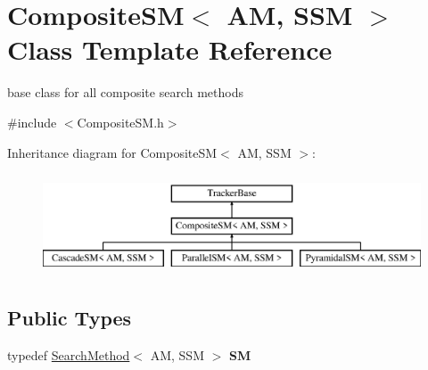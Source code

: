 \hypertarget{classCompositeSM}{\section{Composite\-S\-M$<$ A\-M, S\-S\-M $>$ Class Template Reference}
\label{classCompositeSM}
}


base class for all composite search methods  




{\ttfamily \#include $<$Composite\-S\-M.\-h$>$}

Inheritance diagram for Composite\-S\-M$<$ A\-M, S\-S\-M $>$\-:\begin{figure}[H]
\begin{center}
\leavevmode
\includegraphics[height=3.000000cm]{classCompositeSM}
\end{center}
\end{figure}
\subsection*{Public Types}
\begin{DoxyCompactItemize}
\item 
\hypertarget{classCompositeSM_abf3e40ea4049c095aad36c4e0da0de43}{typedef \hyperlink{classSearchMethod}{Search\-Method}$<$ A\-M, S\-S\-M $>$ {\bfseries S\-M}}\label{classCompositeSM_abf3e40ea4049c095aad36c4e0da0de43}

\end{DoxyCompactItemize}
